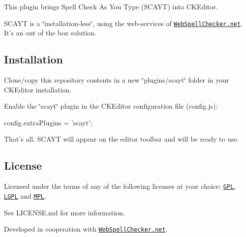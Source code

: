 This plugin brings Spell Check As You Type (S\-C\-A\-Y\-T) into C\-K\-Editor.

S\-C\-A\-Y\-T is a \char`\"{}installation-\/less\char`\"{}, using the web-\/services of \href{http://www.webspellchecker.net/}{\tt Web\-Spell\-Checker.\-net}. It's an out of the box solution.

\subsection*{Installation }


\begin{DoxyEnumerate}
\item Clone/copy this repository contents in a new \char`\"{}plugins/scayt\char`\"{} folder in your C\-K\-Editor installation.
\item Enable the \char`\"{}scayt\char`\"{} plugin in the C\-K\-Editor configuration file (config.\-js)\-: \begin{DoxyVerb} config.extraPlugins = 'scayt';
\end{DoxyVerb}

\end{DoxyEnumerate}

That's all. S\-C\-A\-Y\-T will appear on the editor toolbar and will be ready to use.

\subsection*{License }

Licensed under the terms of any of the following licenses at your choice\-: \href{http://www.gnu.org/licenses/gpl.html}{\tt G\-P\-L}, \href{http://www.gnu.org/licenses/lgpl.html}{\tt L\-G\-P\-L} and \href{http://www.mozilla.org/MPL/MPL-1.1.html}{\tt M\-P\-L}.

See L\-I\-C\-E\-N\-S\-E.\-md for more information.

Developed in cooperation with \href{http://www.webspellchecker.net/}{\tt Web\-Spell\-Checker.\-net}. 
